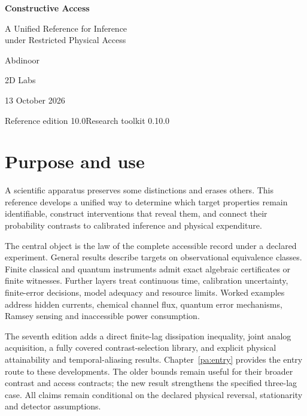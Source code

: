 \documentclass[11pt,oneside]{book}
\theoremstyle{definition}
\theoremstyle{remark}
\begin{document}
\pagestyle{plain}
\frontmatter
\begin{titlepage}
\centering
\vspace*{1.2in}
{\Huge\bfseries Constructive Access\par}
\vspace{0.4in}
{\Large A Unified Reference for Inference\\under Restricted Physical Access\par}
\vspace{0.6in}
{\Large Abdinoor\par}
\vspace{0.12in}
{\large 2D Labs\par}
\vfill
{\large 13 October 2026\par}
\vspace{0.25in}
{\normalsize Reference edition 10.0\quad\textbullet\quad Research toolkit 0.10.0\par}
\end{titlepage}
\chapter*{Purpose and use}
A scientific apparatus preserves some distinctions and erases others. This reference develops a unified way to determine which target properties remain identifiable, construct interventions that reveal them, and connect their probability contrasts to calibrated inference and physical expenditure.

The central object is the law of the complete accessible record under a declared experiment. General results describe targets on observational equivalence classes. Finite classical and quantum instruments admit exact algebraic certificates or finite witnesses. Further layers treat continuous time, calibration uncertainty, finite-error decisions, model adequacy and resource limits. Worked examples address hidden currents, chemical channel flux, quantum error mechanisms, Ramsey sensing and inaccessible power consumption.


The seventh edition adds a direct finite-lag dissipation inequality, joint
analog acquisition, a fully covered contrast-selection library, and explicit
physical attainability and temporal-aliasing results. Chapter~\ref{pa:entry}
provides the entry route to these developments. The older bounds remain useful
for their broader contrast and access contracts; the new result strengthens
the specified three-lag case. All claims remain conditional on the declared
physical reversal, stationarity and detector assumptions.
\end{document}
